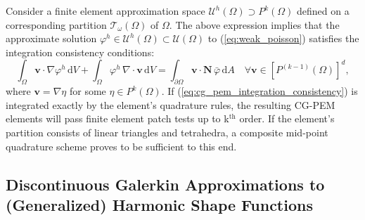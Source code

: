 	Consider a finite element approximation space $\mathcal{U}^h (\Omega) \supset P^k (\Omega)$ defined on a corresponding partition $\mathcal{T}_\omega (\Omega)$ of $\Omega$. The above expression implies that the approximate solution $\varphi^h \in \mathcal{U}^h (\Omega) \subset \mathcal{U} (\Omega)$ to (\ref{eq:weak_poisson}) satisfies the integration consistency conditions:
	\begin{equation}
		\int_{\Omega} \bm{v} \cdot \nabla \varphi^h \, \mathrm dV + \int_{\Omega} \varphi^h \, \nabla \cdot \bm{v} \, \mathrm dV = \int_{\partial \Omega} \bm{v} \cdot \bm{N} \, \bar{\varphi} \, \mathrm dA \quad \forall \bm{v} \in \left[ P^{(k-1)} (\Omega) \right]^d,
		\label{eq:cg_pem_integration_consistency}
	\end{equation}
	where $\bm{v} = \nabla \eta$ for some $\eta \in P^k (\Omega)$. If (\ref{eq:cg_pem_integration_consistency}) is integrated exactly by the element's quadrature rules, the resulting CG-PEM elements will pass finite element patch tests up to k$^{\text{th}}$ order. If the element's partition consists of linear triangles and tetrahedra, a composite mid-point quadrature scheme proves to be sufficient to this end.

\subsection*{Discontinuous Galerkin Approximations to (Generalized) Harmonic Shape Functions}


